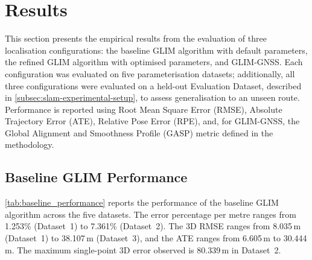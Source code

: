 \section{Results}
\label{sec:slam-results}
This section presents the empirical results from the evaluation of three localisation configurations: the baseline GLIM algorithm with default parameters, the refined GLIM algorithm with optimised parameters, and GLIM-GNSS. Each configuration was evaluated on five parameterisation datasets; additionally, all three configurations were evaluated on a held-out Evaluation Dataset, described in \cref{subsec:slam-experimental-setup}, to assess generalisation to an unseen route. Performance is reported using Root Mean Square Error (RMSE), Absolute Trajectory Error (ATE), Relative Pose Error (RPE), and, for GLIM-GNSS, the Global Alignment and Smoothness Profile (GASP) metric defined in the methodology.

\subsection{Baseline GLIM Performance}

\cref{tab:baseline_performance} reports the performance of the baseline GLIM algorithm across the five datasets. The error percentage per metre ranges from 1.253\% (Dataset~1) to 7.361\% (Dataset~2). The 3D RMSE ranges from 8.035\,m (Dataset~1) to 38.107\,m (Dataset~3), and the ATE ranges from 6.605\,m to 30.444\,m. The maximum single-point 3D error observed is 80.339\,m in Dataset~2.

